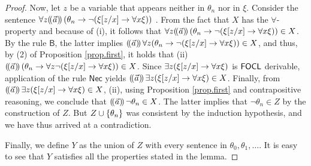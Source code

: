 \documentclass[sigconf,anonymous]{aamas}
\begin{document}
\begin{proof}
Now, let $z$ be a variable that appears neither in $\theta_n$ nor in $\xi$. Consider the sentence $\forall z (\!( \vec{a} )\!)\,(\theta_n\to \neg (\xi [z/x] \to \forall x \xi))$ . From the fact that $X$ has the $\forall$-property and because of (i), it follows that $\forall z (\!( \vec{a} )\!)\,(\theta_n\to \neg (\xi [z/x] \to \forall x \xi))\in X$. By the rule $\mathsf{B}$,  the latter implies $(\!( \vec{a} )\!)\,\forall z(\theta_n\to \neg (\xi [z/x] \to \forall x \xi))\in X$, and thus, by (2) of Proposition \ref{prop.first}, it holds that (ii) $(\!( \vec{a} )\!)\,(\theta_n\to \forall z\neg (\xi [z/x] \to \forall x \xi))\in X$.  Since $\exists z (\xi[z/x] \to \forall x \xi )$ is $\mathsf{FOCL} $ derivable, application of the rule $\mathsf{Nec}$ yields $(\!( \vec{a} )\!)\,\exists z (\xi[z/x] \to \forall x \xi )\in X$. Finally, from $(\!( \vec{a} )\!)\,\exists z (\xi[z/x] \to \forall x \xi )\in X$, (ii), using Proposition \ref{prop.first} and  contrapositive reasoning, we conclude that $(\!( \vec{a} )\!)\,\neg \theta_n\in X$. The latter implies that $\neg \theta_n \in Z$ by the construction of $Z$. But $Z\cup \{\theta_n\}$ was consistent by the induction hypothesis, and we have thus arrived at a contradiction.  

Finally, we define $Y$ as the union of $Z$ with every sentence in $\theta_0,\theta_1,\ldots$. It is easy to see that $Y$ satisfies all the properties stated in the lemma. 
\end{proof}







\end{document}
